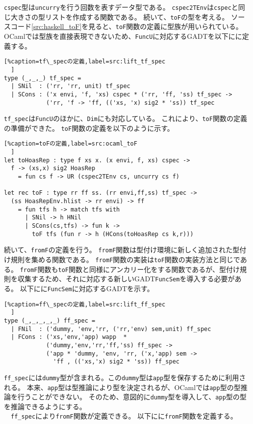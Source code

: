 \documentclass[uplatex]{sumiilab-paper}
\theoremstyle{mystyle}
\numberwithin{definition}{chapter} %
\begin{document}
{\tt cspec}型は{\tt uncurry}を行う回数を表すデータ型である。
{\tt cspec2TEnv}は{\tt cspec}と同じ大きさの型リストを作成する関数である。
続いて、{\tt toF}の型を考える。
ソースコード\ref{src:haskell_toF}を見ると、{\tt toF}関数の定義に型族が用いられている。
OCamlでは型族を直接表現できないため、{\tt FuncU}に対応するGADTを以下にに定義する。

\begin{lstlisting}[%caption=tf\_specの定義,label=src:lift_tf_spec
  ]
type (_,_,_) tf_spec =
  | SNil  : ('rr, 'rr, unit) tf_spec 
  | SCons : ('x envi, 'f, 'xs) cspec * ('rr, 'ff, 'ss) tf_spec -> 
            ('rr, 'f -> 'ff, (('xs, 'x) sig2 * 'ss)) tf_spec 
\end{lstlisting}

{\tt tf\_spec}は{\tt FuncU}のほかに、{\tt Dim}にも対応している。
これにより、{\tt toF}関数の定義の準備ができた。
{\tt toF}関数の定義を以下のように示す。

\begin{lstlisting}[%caption=toFの定義,label=src:ocaml_toF
  ]
let toHoasRep : type f xs x. (x envi, f, xs) cspec -> 
  f -> (xs,x) sig2 HoasRep
    = fun cs f -> UR (cspec2TEnv cs, uncurry cs f)

let rec toF : type rr ff ss. (rr envi,ff,ss) tf_spec -> 
  (ss HoasRepEnv.hlist -> rr envi) -> ff
    = fun tfs h -> match tfs with
      | SNil -> h HNil 
      | SCons(cs,tfs) -> fun k -> 
        toF tfs (fun r -> h (HCons(toHoasRep cs k,r)))
\end{lstlisting}

続いて、{\tt fromF}の定義を行う。
{\tt fromF}関数は型付け環境に新しく追加された型付け規則を集める関数である。
{\tt fromF}関数の実装は{\tt toF}関数の実装方法と同じである。
{\tt fromF}関数も{\tt toF}関数と同様にアンカリー化をする関数であるが、型付け規則を収集するため、それに対応する新しいGADT{\tt FuncSem}を導入する必要がある。
以下にに{\tt FuncSem}に対応するGADTを示す。

\begin{lstlisting}[%caption=ff\_specの定義,label=src:lift_ff_spec
  ]
type (_,_,_,_,_) ff_spec = 
  | FNil  : ('dummy, 'env,'rr, ('rr,'env) sem,unit) ff_spec 
  | FCons : ('xs,'env,'app) wapp  * 
            ('dummy,'env,'rr,'ff,'ss) ff_spec -> 
            ('app * 'dummy, 'env, 'rr, ('x,'app) sem -> 
              'ff , (('xs,'x) sig2 * 'ss)) ff_spec
\end{lstlisting}

{\tt ff\_spec}には{\tt dummy}型が含まれる。この{\tt dummy}型は{\tt app}型を保存するために利用される。
本来、{\tt app}型は型推論により型を決定されるが、OCamlでは{\tt app}型の型推論を行うことができない。
そのため、意図的に{\tt dummy}型を導入して、{\tt app}型の型を推論できるようにする。\\
　{\tt ff\_spec}により{\tt fromF}関数が定義できる。
以下にに{\tt fromF}関数を定義する。
\end{document}
